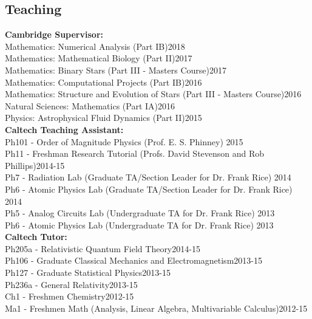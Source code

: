 \documentclass[line, margin]{res3address}
\begin{document}
\begin{resume}
\section{Teaching}
\textbf{Cambridge Supervisor:}\\
\phantom{4ex} Mathematics: Numerical Analysis (Part IB)\hfill 2018\\
\phantom{4ex} Mathematics: Mathematical Biology (Part II)\hfill 2017\\
\phantom{4ex} Mathematics: Binary Stars (Part III - Masters Course)\hfill 2017\\
\phantom{4ex} Mathematics: Computational Projects (Part IB)\hfill 2016\\
\phantom{4ex} Mathematics: Structure and Evolution of Stars (Part III - Masters Course)\hfill 2016\\
\phantom{4ex} Natural Sciences: Mathematics (Part IA)\hfill 2016\\
\phantom{4ex} Physics: Astrophysical Fluid Dynamics (Part II)\hfill 2015\\
\textbf{Caltech Teaching Assistant:}\\
\phantom{4ex} Ph101 - Order of Magnitude Physics (Prof. E. S. Phinney) \hfill 2015\\
\phantom{4ex} Ph11 - Freshman Research Tutorial (Profs. David Stevenson and Rob Phillips)\hfill 2014-15\\
\phantom{4ex} Ph7 - Radiation Lab (Graduate TA/Section Leader for Dr. Frank Rice) \hfill 2014\\
\phantom{4ex} Ph6 - Atomic Physics Lab (Graduate TA/Section Leader for Dr. Frank Rice) \hfill 2014\\
\phantom{4ex} Ph5 - Analog Circuits Lab (Undergraduate TA for Dr. Frank Rice) \hfill 2013\\
\phantom{4ex} Ph6 - Atomic Physics Lab (Undergraduate TA for Dr. Frank Rice) \hfill 2013\\
\textbf{Caltech Tutor:}\\
\phantom{4ex} Ph205a - Relativistic Quantum Field Theory\hfill 2014-15\\
\phantom{4ex} Ph106 - Graduate Classical Mechanics and Electromagnetism\hfill 2013-15\\
\phantom{4ex} Ph127 - Graduate Statistical Physics\hfill 2013-15\\
\phantom{4ex} Ph236a - General Relativity\hfill 2013-15\\
\phantom{4ex} Ch1 - Freshmen Chemistry\hfill 2012-15\\
\phantom{4ex} Ma1 - Freshmen Math (Analysis, Linear Algebra, Multivariable Calculus)\hfill 2012-15\\

\end{resume}
\end{document}
